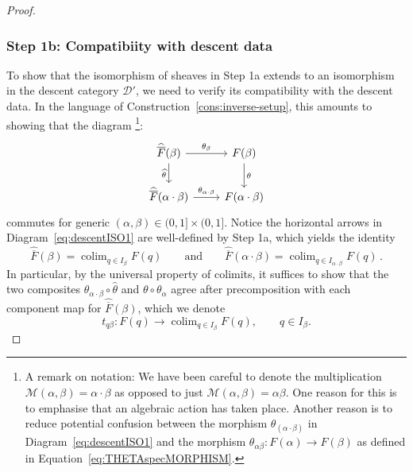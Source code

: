 \documentclass[a4paper, 11pt,reqno]{amsart}
\newcommand{\M}{\mathcal{M}}
\newcommand{\D}{\mathcal{D}}
\DeclareMathOperator*{\colim}{colim}
\begin{document}
\begin{proof}
\subsubsection*{Step 1b: Compatibiity with descent data} To show that the isomorphism of sheaves in Step 1a extends to an isomorphism in the descent category $\D'$, we need to verify its compatibility with the descent data. In the language of Construction~\ref{cons:inverse-setup}, this amounts to showing that the diagram \footnote{A remark on notation: We have been careful to denote the multiplication $\M(\alpha,\beta)=\alpha\cdot\beta$ as opposed to just $\M(\alpha,\beta)=\alpha\beta$. One reason for this is to emphasise that an algebraic action has taken place. Another reason is to reduce potential confusion between the morphism $\theta_{(\alpha\cdot\beta)}$ in Diagram~\eqref{eq:descentISO1} and the  morphism $\theta_{\alpha\beta}\colon F(\alpha)\rightarrow F(\beta)$ as defined in Equation~\eqref{eq:THETAspecMORPHISM}.}: %
\begin{equation}\label{eq:descentISO1}
\begin{tikzcd}
\widehat{\overline{F}}(\beta) \ar[r,"\theta_\beta"] \ar[d,swap,"\widehat{\theta}"] & F(\beta) \ar[d,"\theta"]\\
\widehat{\overline{F}}(\alpha\cdot \beta) \ar[r,"\theta_{\alpha\cdot\beta}"]& F(\alpha\cdot\beta)
\end{tikzcd}
\end{equation}
commutes for generic $(\alpha, \beta)\in(0,1]\times (0,1]$. Notice  the horizontal arrows in Diagram~\eqref{eq:descentISO1} are well-defined by Step 1a, which yields the identity  \[
\widehat{\overline F}(\beta)
=
\colim_{q\in I_\beta}F(q) \qquad\text{and}\qquad \widehat{\overline F}(\alpha\cdot\beta)
=
\colim_{q\in I_{\alpha\cdot\beta}}F(q) \,.
\]
In particular, by the universal property of colimits, it suffices to show that the two composites $\theta_{\alpha\cdot\beta}\circ\widehat\theta$ and $\theta\circ\theta_\alpha$ agree after precomposition with each component map for $\widehat{\overline F}(\beta)$, which we denote
\[
t_{q\beta}\colon F(q)\longrightarrow
\colim_{q\in I_\beta}F(q),
\qquad q\in I_\beta.
\]


\end{proof}
\end{document}
